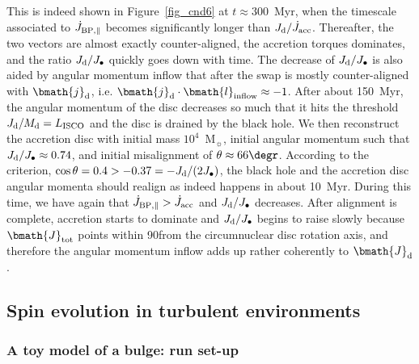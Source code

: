 \documentclass[a4paper,fleqn,usenatbib]{mnras}
\begin{document}
This is indeed shown in Figure~\ref{fig_cnd6} at $t \approx 300$~Myr, when the timescale associated to $\dot{J}_{\rm BP, \parallel}$ becomes significantly longer than $J_{\rm d} / \dot{J}_{\rm acc}$.
Thereafter, the two vectors are almost exactly counter-aligned, the accretion torques dominates, and the ratio $J_{\rm d}/J_{\bullet}$ quickly goes down with time. The decrease of $J_{\rm d}/J_{\bullet}$ is also aided by angular momentum inflow that after the swap is mostly counter-aligned with $\bmath{j}_{\rm d}$, i.e. $\bmath{j}_{\rm d} \cdot \bmath{l}_{\rm inflow} \approx -1$.
After about 150~Myr, the angular momentum of the disc decreases so much that it hits the threshold $J_{\rm d}/M_{\rm d} = L_{\rm ISCO}$ and the disc is drained by the black hole.
We then reconstruct the accretion disc with initial mass $10^4$~M$_{\sun}$, initial angular momentum such that $J_{\rm d}/J_{\bullet} \approx 0.74$, and initial misalignment of $\theta \approx 66\degr$.
According to the \citet{king+05} criterion, $\cos\theta = 0.4 > -0.37 = -J_{\rm d}/(2 J_{\bullet})$, the black hole and the accretion disc angular momenta should realign as indeed happens in about 10~Myr.
During this time, we have again that $\dot{J}_{\rm BP,\parallel} > \dot{J}_{\rm acc}$ and $J_{\rm d}/J_{\bullet}$ decreases.
After alignment is complete, accretion starts to dominate and $J_{\rm d}/J_{\bullet}$ begins to raise slowly because $\bmath{J}_{\rm tot}$ points within 90\degr from the circumnuclear disc rotation axis, and therefore the angular momentum inflow adds up rather coherently to $\bmath{J}_{\rm d}$.


\subsection{Spin evolution in turbulent environments} \label{subsec_turb_cloud}

\subsubsection{A toy model of a bulge: run set-up}
\end{document}
